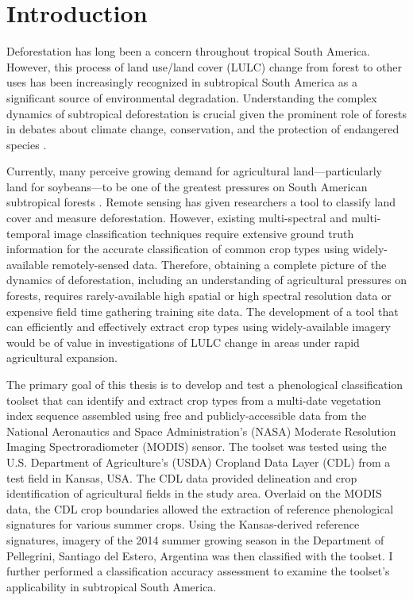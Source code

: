 \chapter{Introduction}
\label{intro}

Deforestation has long been a concern throughout tropical South America. However, this process of land use/land cover (LULC) change from forest to other uses has been increasingly recognized in subtropical South America as a significant source of environmental degradation. Understanding the complex dynamics of subtropical deforestation is crucial given the prominent role of forests in debates about climate change, conservation, and the protection of endangered species \autocites{geist2002proximate}{zak2004do-subtropical}{bonnie2000counting}{houghton1994the-worldwide}{sala2000global}.

Currently, many perceive growing demand for agricultural land---particularly land for soybeans---to be one of the greatest pressures on South American subtropical forests \autocites{pengue2005transgenic}{grau2005agriculture}{altieri2006gm-soybean:}. Remote sensing has given researchers a tool to classify land cover and measure deforestation. However, existing multi-spectral and multi-temporal image classification techniques require extensive ground truth information for the accurate classification of common crop types using widely-available remotely-sensed data. Therefore, obtaining a complete picture of the dynamics of deforestation, including an understanding of agricultural pressures on forests, requires rarely-available high spatial or high spectral resolution data \autocite{senay2000using} or expensive field time gathering training site data. The development of a tool that can efficiently and effectively extract crop types using widely-available imagery would be of value in investigations of LULC change in areas under rapid agricultural expansion.

The primary goal of this thesis is to develop and test a phenological classification toolset that can identify and extract crop types from a multi-date vegetation index sequence assembled using free and publicly-accessible data from the National Aeronautics and Space Administration’s (NASA) Moderate Resolution Imaging Spectroradiometer (MODIS) sensor. The toolset was tested using the U.S. Department of Agriculture's (USDA) Cropland Data Layer (CDL) from a test field in Kansas, USA. The CDL data provided delineation and crop identification of agricultural fields in the study area. Overlaid on the MODIS data, the CDL crop boundaries allowed the extraction of reference phenological signatures for various summer crops. Using the Kansas-derived reference signatures, imagery of the 2014 summer growing season in the Department of Pellegrini, Santiago del Estero, Argentina was then classified with the toolset. I further performed a classification accuracy assessment to examine the toolset's applicability in subtropical South America.

